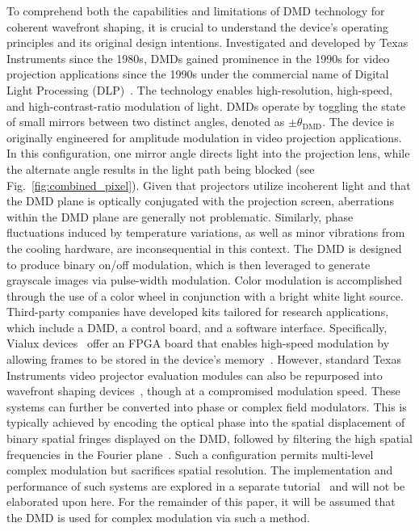 \documentclass[12pt]{iopart}
\begin{document}
To comprehend both the capabilities and limitations
of DMD technology for coherent wavefront shaping,
it is crucial to understand the device's operating principles
and its original design intentions.
Investigated and developed by Texas Instruments since the 1980s,
DMDs gained prominence in the 1990s for video projection applications since the 1990s
under the commercial name of Digital Light Processing (DLP)~\cite{hornbeck1997digital,Dudley2003emerging}.
The technology enables high-resolution, high-speed, and high-contrast-ratio modulation of light.
DMDs operate by toggling the state of small mirrors between two distinct angles, denoted as $\pm \theta_\text{DMD}$.
The device is originally engineered for amplitude modulation in video projection applications.
In this configuration, one mirror angle directs light into the projection lens,
while the alternate angle results in the light path being blocked (see Fig.~\ref{fig:combined_pixel}).
Given that projectors utilize incoherent light and that the DMD plane is optically conjugated with the projection screen,
aberrations within the DMD plane are generally not problematic.
Similarly, phase fluctuations induced by temperature variations,
as well as minor vibrations from the cooling hardware, are inconsequential in this context.
The DMD is designed to produce binary on/off modulation,
which is then leveraged to generate grayscale images via pulse-width modulation.
Color modulation is accomplished through the use of a color wheel in conjunction with a bright white light source.\\

Third-party companies have developed kits tailored for research applications,
which include a DMD, a control board, and a software interface.
Specifically, Vialux devices~\cite{vialux} offer an FPGA board that enables high-speed modulation
by allowing frames to be stored in the device's memory~\cite{hofling2004alp}.
However, standard Texas Instruments video projector evaluation modules can also be repurposed into wavefront shaping devices~\cite{Cox2021converting},
though at a compromised modulation speed.
These systems can further be converted into phase or complex field modulators.
This is typically achieved by encoding the optical phase into
the spatial displacement of binary spatial fringes displayed on the DMD,
followed by filtering the high spatial frequencies in the Fourier plane~\cite{lee1979binary}.
Such a configuration permits multi-level complex modulation but sacrifices spatial resolution.
The implementation and performance of such systems are explored in a separate tutorial~\cite{Gutierrez2024DMD}
and will not be elaborated upon here.
For the remainder of this paper, it will be assumed that the DMD is used for complex modulation via such a method.\\
\end{document}

